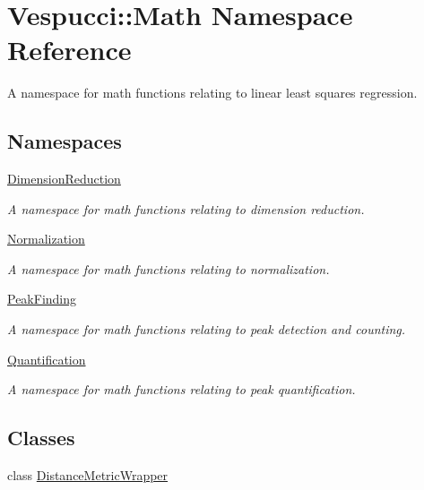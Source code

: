 \hypertarget{namespace_vespucci_1_1_math}{}\section{Vespucci\+:\+:Math Namespace Reference}
\label{namespace_vespucci_1_1_math}


A namespace for math functions relating to linear least squares regression.  


\subsection*{Namespaces}
\begin{DoxyCompactItemize}
\item 
 \hyperlink{namespace_vespucci_1_1_math_1_1_dimension_reduction}{Dimension\+Reduction}
\begin{DoxyCompactList}\small\item\em A namespace for math functions relating to dimension reduction. \end{DoxyCompactList}\item 
 \hyperlink{namespace_vespucci_1_1_math_1_1_normalization}{Normalization}
\begin{DoxyCompactList}\small\item\em A namespace for math functions relating to normalization. \end{DoxyCompactList}\item 
 \hyperlink{namespace_vespucci_1_1_math_1_1_peak_finding}{Peak\+Finding}
\begin{DoxyCompactList}\small\item\em A namespace for math functions relating to peak detection and counting. \end{DoxyCompactList}\item 
 \hyperlink{namespace_vespucci_1_1_math_1_1_quantification}{Quantification}
\begin{DoxyCompactList}\small\item\em A namespace for math functions relating to peak quantification. \end{DoxyCompactList}\end{DoxyCompactItemize}
\subsection*{Classes}
\begin{DoxyCompactItemize}
\item 
class \hyperlink{class_vespucci_1_1_math_1_1_distance_metric_wrapper}{Distance\+Metric\+Wrapper}
\end{DoxyCompactItemize}
